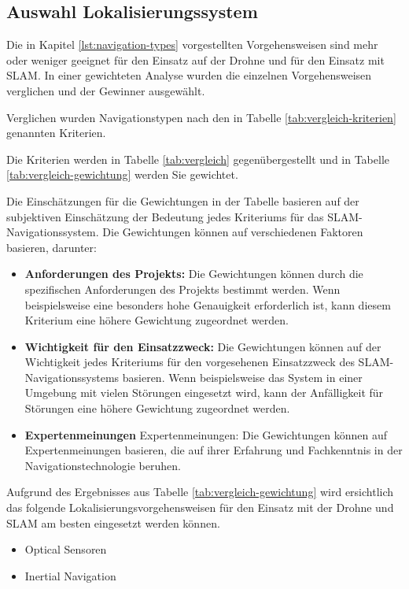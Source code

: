 \subsection{Auswahl Lokalisierungssystem}

Die in Kapitel \ref{lst:navigation-types} vorgestellten Vorgehensweisen sind mehr oder weniger geeignet für den Einsatz auf der Drohne und für den Einsatz mit \ac{SLAM}.
In einer gewichteten Analyse wurden die einzelnen Vorgehensweisen verglichen und der Gewinner ausgewählt.

Verglichen wurden Navigationstypen nach den in Tabelle \ref{tab:vergleich-kriterien} genannten Kriterien.

Die Kriterien werden in Tabelle \ref{tab:vergleich} gegenübergestellt und in Tabelle \ref{tab:vergleich-gewichtung} werden Sie gewichtet.

Die Einschätzungen für die Gewichtungen in der Tabelle basieren auf der subjektiven Einschätzung der Bedeutung jedes Kriteriums für das \ac{SLAM}-Navigationssystem. Die Gewichtungen können auf verschiedenen Faktoren basieren, darunter:

\begin{itemize}
\item \textbf{Anforderungen des Projekts:} Die Gewichtungen können durch die spezifischen Anforderungen des Projekts bestimmt werden. Wenn beispielsweise eine besonders hohe Genauigkeit erforderlich ist, kann diesem Kriterium eine höhere Gewichtung zugeordnet werden.

\item \textbf{Wichtigkeit für den Einsatzzweck:} Die Gewichtungen können auf der Wichtigkeit jedes Kriteriums für den vorgesehenen Einsatzzweck des SLAM-Navigationssystems basieren. Wenn beispielsweise das System in einer Umgebung mit vielen Störungen eingesetzt wird, kann der Anfälligkeit für Störungen eine höhere Gewichtung zugeordnet werden.
\item \textbf{Expertenmeinungen} Expertenmeinungen: Die Gewichtungen können auf Expertenmeinungen basieren, die auf ihrer Erfahrung und Fachkenntnis in der Navigationstechnologie beruhen.
\end{itemize}

Aufgrund des Ergebnisses aus Tabelle \ref{tab:vergleich-gewichtung} wird ersichtlich das folgende Lokalisierungsvorgehensweisen für den Einsatz mit der Drohne und SLAM am besten eingesetzt werden können.

\begin{itemize}
    \item Optical Sensoren
    \item Inertial Navigation
\end{itemize}

